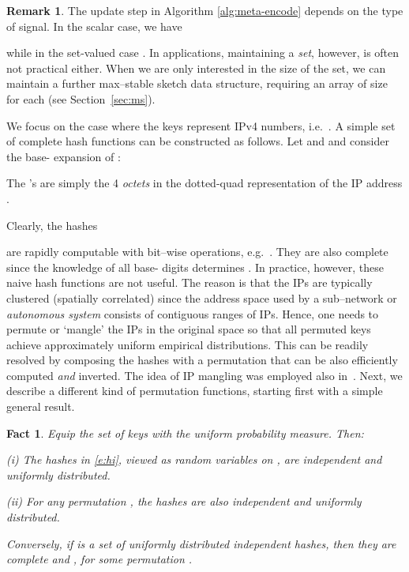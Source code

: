 \documentclass[10pt, conference, letterpaper,onecolumn]{IEEEtranv1.8}
\theoremstyle{plain}\newtheorem{thm}{Theorem}\newtheorem{lem}{Lemma}
\newtheorem{fact}{Fact}
\theoremstyle{definition}
\newtheorem{rem}{Remark}
\begin{document}
\begin{rem}\label{rem:update} The update step in Algorithm \ref{alg:meta-encode} depends on the type of signal. In the scalar case, we have

while in the set-valued case .
In applications, maintaining a {\em set}, however, is often not practical either. When we are only interested in the size of the set, 
we can maintain a further max--stable sketch data structure, requiring an array of size  for each  (see Section~\ref{sec:ms}).
\end{rem}


\smallskip
{}
We focus on the case where the keys represent IPv4 numbers, i.e.\ . A simple set of complete
hash functions can be constructed as follows. Let  and  and consider the base- expansion of :

The 's are simply the 4 \emph{octets} in the dotted-quad representation of the IP address . 

Clearly, the hashes 

are rapidly computable with bit--wise operations, e.g.\ .  They are also complete since
the knowledge of all  base- digits determines . In practice, however, these naive hash functions are not useful. The reason
is that the IPs are typically clustered (spatially correlated) since the address space used by a sub--network or \emph{autonomous system}
consists of contiguous ranges of IPs. Hence, one needs to permute or `mangle' the IPs
in the original space  so that all permuted keys achieve approximately uniform empirical distributions.
This can be readily resolved by composing the hashes with a permutation that can be also efficiently 
computed {\em and} inverted.  The idea of IP mangling was employed also in~\cite{4146856}. 
Next, we describe a different kind of permutation functions, starting first with a simple general result.

\begin{fact}  Equip the set of keys  with the uniform probability measure. Then:

 {\rm (i)} The hashes  in \eqref{e:hi}, viewed as random variables on ,
  are independent and uniformly distributed.
 
 {\rm (ii)} For any permutation , the hashes  are also independent
 and uniformly distributed.
 
Conversely, if  is a set of uniformly distributed independent hashes, then they are complete and
, for some permutation .
\end{fact}
\end{document}
